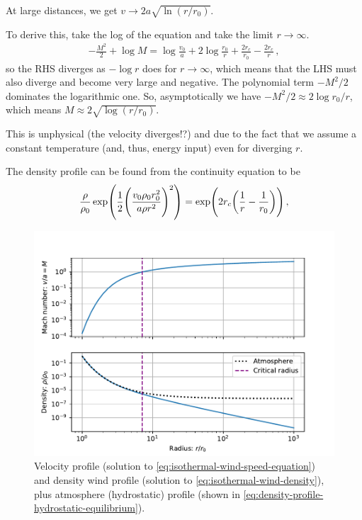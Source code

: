 \documentclass[main.tex]{subfiles}
\begin{document}
At large distances, we get \(v \rightarrow 2 a \sqrt{\ln(r/r_0)}\).

\begin{bluebox}
To derive this, take the log of the equation and take the limit \(r \rightarrow \infty \).
%
\begin{align}
-\frac{M^2}{2} + \log M 
= \log \frac{v_0 }{a} + 2 \log \frac{r_0 }{r} + \frac{2 r_c}{r_0 } - \frac{2 r_c}{r}
\,,
\end{align}
%
so the RHS diverges as \(- \log r\) does for \(r \rightarrow \infty\), which means that the LHS must also diverge and become very large and negative. The polynomial term \(-M^2/2\) dominates the logarithmic one.
So, asymptotically we have \(- M^2/2 \approx 2 \log r_0 /r \), which means \(M \approx 2 \sqrt{\log (r/r_0) }\).
\end{bluebox}

This is unphysical (the velocity diverges!?) and due  to the fact that we assume a constant temperature (and, thus, energy input) even for diverging \(r\). 

The density profile can be found from the continuity equation to be 
%
\begin{align} \label{eq:isothermal-wind-density}
\frac{\rho}{\rho_0} \exp(\frac{1}{2} \qty(\frac{v_0 \rho_0 r_0^2}{a \rho r^2})^2) = \exp(2 r_c \qty(\frac{1}{r} - \frac{1}{r_0}))
\,,
\end{align}
%
\begin{figure}[H]
\centering
\includegraphics[width=\textwidth]{figures/atmosphere_critical_radius.pdf}
\caption{Velocity profile (solution to \eqref{eq:isothermal-wind-speed-equation}) and density wind profile (solution to \eqref{eq:isothermal-wind-density}), plus atmosphere (hydrostatic) profile (shown in \eqref{eq:density-profile-hydrostatic-equilibrium}).}
\label{fig:atmosphere_critical_radius}
\end{figure}
  
\end{document}
